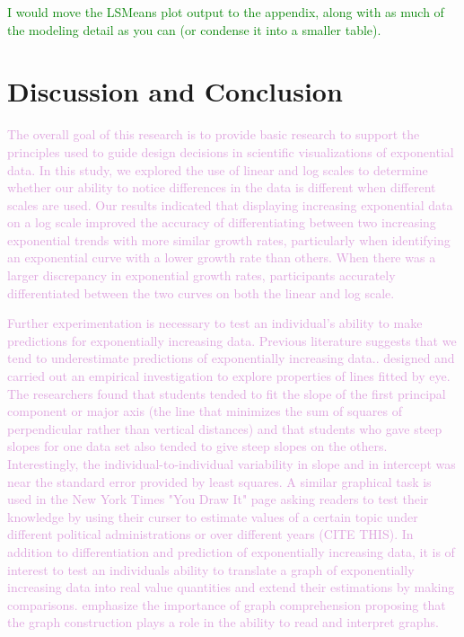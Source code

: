 \documentclass[]{interact}
\theoremstyle{plain}%
\theoremstyle{definition}
\theoremstyle{remark}
\begin{document}
\textcolor{Green}{I would move the LSMeans plot output to the appendix, along with as much of the modeling detail as you can (or condense it into a smaller table).}

\hypertarget{discussion-and-conclusion}{%
\section{Discussion and Conclusion}\label{discussion-and-conclusion}}

\textcolor{Plum}{
The overall goal of this research is to provide basic research to support the principles used to guide design decisions in scientific visualizations of exponential data. 
In this study, we explored the use of linear and log scales to determine whether our ability to notice differences in the data is different when different scales are used. 
Our results indicated that displaying increasing exponential data on a log scale improved the accuracy of differentiating between two increasing exponential trends with more similar growth rates, particularly when identifying an exponential curve with a lower growth rate than others. When there was a larger discrepancy in exponential growth rates, participants accurately differentiated between the two curves on both the linear and log scale.
}

\textcolor{Plum}{
Further experimentation is necessary to test an individual's ability to make predictions for exponentially increasing data. 
Previous literature suggests that we tend to underestimate predictions of exponentially increasing data.\citep{jones_generalized_1979, jones_polynomial_1977, wagenaar_extrapolation_1978}.
\citep{mosteller_eye_1981} designed and carried out an empirical investigation to explore properties of lines fitted by eye.
The researchers found that students tended to fit the slope of the first principal component or major axis (the line that minimizes the sum of squares of perpendicular rather than vertical distances) and that students who gave steep slopes for one data set also tended to give steep slopes on the others. 
Interestingly, the individual-to-individual variability in slope and in intercept was near the standard error provided by least squares.
A similar graphical task is used in the New York Times "You Draw It" page asking readers to test their knowledge by using their curser to estimate values of a certain topic under different political administrations or over different years (CITE THIS).
In addition to differentiation and prediction of exponentially increasing data, it is of interest to test an individuals ability to translate a graph of exponentially increasing data into real value quantities and extend their estimations by making comparisons. 
\citep{friel_making_2001} emphasize the importance of graph comprehension proposing that the graph construction plays a role in the ability to read and interpret graphs.
}
\end{document}
